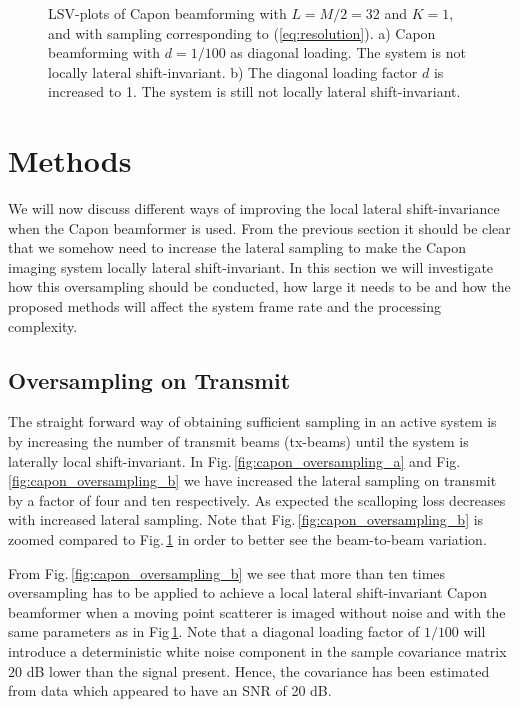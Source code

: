 \documentclass[journal]{IEEEtran}
\newcommand{\img}{img/}
\begin{document}
\begin{figure}[!t]
\centerline{
}
\caption{LSV-plots of Capon beamforming with $L=M/2=32$ and $K=1$, and with sampling corresponding to (\ref{eq:resolution}). a) Capon beamforming with $d=1/100$ as diagonal loading. The system is not locally lateral shift-invariant. b) The diagonal loading factor $d$ is increased to 1. The system is still not locally lateral shift-invariant.}
\label{fig:capon}
\end{figure}

\section{Methods}\label{sec:methods}
We will now discuss different ways of improving the local lateral shift-invariance when the Capon beamformer is used. From the previous section it should be clear that we somehow need to increase the lateral sampling to make the Capon imaging system locally lateral shift-invariant. In this section we will investigate how this oversampling should be conducted, how large it needs to be and how the proposed methods will affect the system frame rate and the processing complexity.

\subsection{Oversampling on Transmit}
The straight forward way of obtaining sufficient sampling in an active system is by increasing the number of transmit beams (tx-beams) until the system is laterally local shift-invariant. In Fig.\,\ref{fig:capon_oversampling_a} and Fig.\,\ref{fig:capon_oversampling_b} we have increased the lateral sampling on transmit by a factor of four and ten respectively. As expected the scalloping loss decreases with increased lateral sampling. Note that Fig.\,\ref{fig:capon_oversampling_b} is zoomed compared to Fig.\,\ref{fig:capon} in order to better see the beam-to-beam variation.

From Fig.\,\ref{fig:capon_oversampling_b} we see that more than ten times oversampling has to be applied to achieve a local lateral shift-invariant Capon beamformer when a moving point scatterer is imaged without noise and with the same parameters as in Fig\,\ref{fig:capon}. %
Note that a diagonal loading factor of $1/100$ will introduce a deterministic white noise component in the sample covariance matrix $20$ dB lower than the signal present. Hence, the covariance has been estimated from data which appeared to have an SNR of 20 dB.
\end{document}
